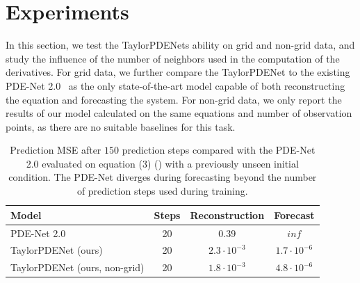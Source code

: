 \documentclass[runningheads]{llncs}
\begin{document}
\section{Experiments}
In this section, we test the TaylorPDENets ability on grid and non-grid data, and study the influence of the number of neighbors used in the computation of the derivatives.
For grid data, we further compare the TaylorPDENet to the existing PDE-Net 2.0~\cite{long2019pde,long2018pde} as the only state-of-the-art model capable of both reconstructing the equation and forecasting the system.
For non-grid data, we only report the results of our model calculated on the same equations and number of observation points, as there are no suitable baselines for this task.
%
%
\begin{table}[!t]
\centering
\caption{Prediction MSE after $150$ prediction steps compared with the PDE-Net 2.0 evaluated on equation (3) () with a previously unseen initial condition.
The PDE-Net diverges during forecasting beyond the number of prediction steps used during training.}
\label{tab:comparison}
\begin{tabular}{lc@{\hskip 0.15in}c@{\hskip 0.15in}c}
\toprule
Model                           & Steps & Reconstruction        & Forecast\\
\midrule
PDE-Net 2.0                     & 20    & $0.39$    & $inf$\\
TaylorPDENet (ours)             & 20    & $2.3\cdot 10^{-3}$    & $1.7\cdot10^{-6}$\\
TaylorPDENet (ours, non-grid)   & 20    & $1.8\cdot 10^{-3}$    & $4.8\cdot10^{-6}$\\
\bottomrule
\end{tabular}
\end{table}
%
\end{document}
